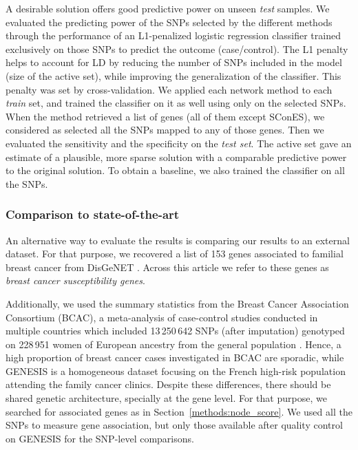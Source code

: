 \documentclass[twocolumn, 11pt]{article}
\begin{document}
A desirable solution offers good predictive power on unseen \emph{test} samples. We evaluated the predicting power of the SNPs selected by the different methods through the performance of an L1-penalized logistic regression classifier trained exclusively on those SNPs to predict the outcome (case/control). The L1 penalty helps to account for LD by reducing the number of SNPs included in the model (size of the active set), while improving the generalization of the classifier. This penalty was set by cross-validation. We applied each network method to each \emph{train} set, and trained the classifier on it as well using only on the selected SNPs. When the method retrieved a list of genes (all of them except SConES), we considered as selected all the SNPs mapped to any of those genes. Then we evaluated the sensitivity and the specificity on the \emph{test set}. The active set gave an estimate of a plausible, more sparse solution with a comparable predictive power to the original solution. To obtain a baseline, we also trained the classifier on all the SNPs. 

\subsubsection{Comparison to state-of-the-art}
\label{methods:bcac}

An alternative way to evaluate the results is comparing our results to an external dataset. For that purpose, we recovered a list of 153 genes associated to familial breast cancer from DisGeNET \cite{pinero_disgenet:_2017}. Across this article we refer to these genes as \emph{breast cancer susceptibility genes}.

Additionally, we used the summary statistics from the Breast Cancer Association Consortium (BCAC), a meta-analysis of case-control studies conducted in multiple countries which included 13\,250\,642 SNPs (after imputation) genotyped on 228\,951 women of European ancestry from the general population \cite{Michailidou2017}. Hence, a high proportion of breast cancer cases investigated in BCAC are sporadic, while GENESIS is a homogeneous dataset focusing on the French high-risk population attending the family cancer clinics. Despite these differences, there should be shared genetic architecture, specially at the gene level. For that purpose, we searched for associated genes as in Section~\ref{methods:node_score}. We used all the SNPs to measure gene association, but only those available after quality control on GENESIS for the SNP-level comparisons.
\end{document}
